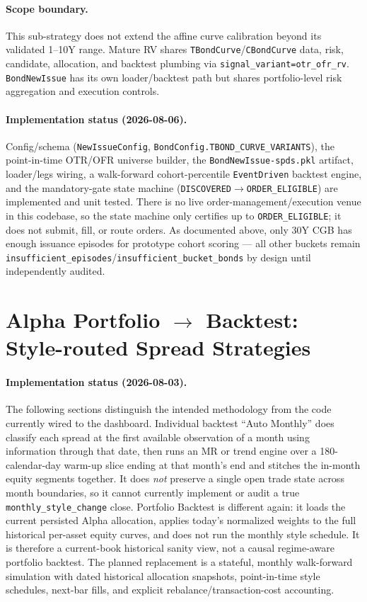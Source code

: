 \paragraph{Scope boundary.}
This sub-strategy does not extend the affine curve calibration beyond its validated
1--10Y range.  Mature RV shares \texttt{TBondCurve}/\texttt{CBondCurve} data, risk,
candidate, allocation, and backtest plumbing via \texttt{signal\_variant=otr\_ofr\_rv}.
\texttt{BondNewIssue} has its own loader/backtest path but shares portfolio-level
risk aggregation and execution controls.

\paragraph{Implementation status (2026-08-06).} Config/schema
(\texttt{NewIssueConfig}, \texttt{BondConfig.TBOND\_CURVE\_VARIANTS}), the
point-in-time OTR/OFR universe builder, the \texttt{BondNewIssue-spds.pkl}
artifact, loader/legs wiring, a walk-forward cohort-percentile
\texttt{EventDriven} backtest engine, and the mandatory-gate state machine
(\texttt{DISCOVERED}$\to$\texttt{ORDER\_ELIGIBLE}) are implemented and unit
tested. There is no live order-management/execution venue in this codebase,
so the state machine only certifies up to \texttt{ORDER\_ELIGIBLE}; it does
not submit, fill, or route orders. As documented above, only 30Y CGB has
enough issuance episodes for prototype cohort scoring — all other buckets
remain \texttt{insufficient\_episodes}/\texttt{insufficient\_bucket\_bonds}
by design until independently audited.

\section{Alpha Portfolio $\rightarrow$ Backtest: Style-routed Spread Strategies}

\paragraph{Implementation status (2026-08-03).} The following sections distinguish
the intended methodology from the code currently wired to the dashboard. Individual
backtest ``Auto Monthly'' does classify each spread at the first available observation
of a month using information through that date, then runs an MR or trend engine over a
180-calendar-day warm-up slice ending at that month's end and stitches the in-month
equity segments together. It does \emph{not} preserve a single open trade state across
month boundaries, so it cannot currently implement or audit a true
\texttt{monthly\_style\_change} close. Portfolio Backtest is different again: it loads
the current persisted Alpha allocation, applies today's normalized weights to the full
historical per-asset equity curves, and does not run the monthly style schedule. It is
therefore a current-book historical sanity view, not a causal regime-aware portfolio
backtest. The planned replacement is a stateful, monthly walk-forward simulation with
dated historical allocation snapshots, point-in-time style schedules, next-bar fills,
and explicit rebalance/transaction-cost accounting.

